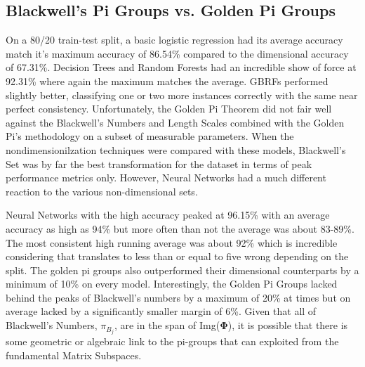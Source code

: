 \documentclass{article}
\theoremstyle{definition}
\begin{document}




  

\subsection{Blackwell's Pi Groups vs. Golden Pi Groups}

On a 80/20 train-test split, a basic logistic regression had its average accuracy match it's maximum accuracy of 86.54\% compared to the dimensional accuracy of 67.31\%.   Decision Trees and Random Forests had an incredible show of force at 92.31\%  where again the maximum matches the average.  GBRFs performed slightly better,  classifying one or two more instances correctly with the same near perfect consistency.   Unfortunately, the Golden Pi Theorem did not fair well against the Blackwell's Numbers and Length Scales combined with the Golden Pi's methodology on a subset of measurable parameters.  When the nondimensionilzation techniques were compared with these models, Blackwell's Set was by far the best transformation for the dataset in terms of peak performance metrics only.   However, Neural Networks had a much different reaction to the various non-dimensional sets.


Neural Networks with the high accuracy peaked at 96.15\% with an average accuracy as high as 94\% but more often than not the average was about 83-89\%.  The most consistent high running average was about 92\% which is incredible considering that translates to less than or equal to five wrong depending on the split.  The golden pi groups  also outperformed their dimensional counterparts by a minimum of 10\% on every model.  Interestingly, the Golden Pi Groups lacked behind the peaks of Blackwell's numbers by a maximum of 20\% at times  but on average lacked by a significantly smaller margin of 6\%.  
 Given that all of Blackwell's Numbers, $\pi_{B_{j}} $, are in the span of Img($\boldsymbol{\Phi}$), it is possible that there is some geometric or algebraic link to the pi-groups that can exploited from the fundamental Matrix Subspaces.
\end{document}
